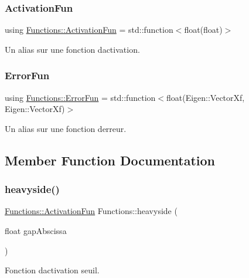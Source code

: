 \subsubsection{\texorpdfstring{Activation\+Fun}{ActivationFun}}
{\footnotesize\ttfamily using \hyperlink{structFunctions_ad25362ffa52b2f7933431190546593ac}{Functions\+::\+Activation\+Fun} =  std\+::function$<$float(float)$>$}



Un alias sur une fonction d\textquotesingle{}activation. 

\mbox{\label{structFunctions_a834bc4170f1caa8c77272ecf51dbae5c}} 
\subsubsection{\texorpdfstring{Error\+Fun}{ErrorFun}}
{\footnotesize\ttfamily using \hyperlink{structFunctions_a834bc4170f1caa8c77272ecf51dbae5c}{Functions\+::\+Error\+Fun} =  std\+::function$<$float(Eigen\+::\+Vector\+Xf, Eigen\+::\+Vector\+Xf)$>$}



Un alias sur une fonction d\textquotesingle{}erreur. 



\subsection{Member Function Documentation}
\mbox{\label{structFunctions_a683c495693f3e2a5ec55e30edaccfd2d}} 
\subsubsection{\texorpdfstring{heavyside()}{heavyside()}}
{\footnotesize\ttfamily \hyperlink{structFunctions_ad25362ffa52b2f7933431190546593ac}{Functions\+::\+Activation\+Fun} Functions\+::heavyside (\begin{DoxyParamCaption}\item[{float}]{gap\+Abscissa }\end{DoxyParamCaption})\hspace{0.3cm}{\ttfamily [static]}}



Fonction d\textquotesingle{}activation seuil. 

